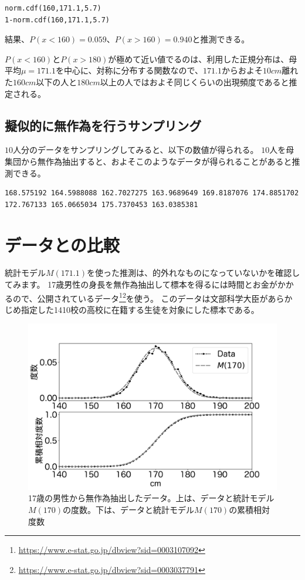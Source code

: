 \begin{lstlisting}
norm.cdf(160,171.1,5.7)
1-norm.cdf(160,171.1,5.7)
\end{lstlisting}
結果、$P(x<160)=0.059$、$P(x>160)=0.940$と推測できる。

$P(x<160)$と$P(x>180)$が極めて近い値でるのは、利用した正規分布は、母平均$\mu=171.1$を中心に、対称に分布する関数なので、$171.1$からおよそ$10cm$離れた$160cm$以下の人と$180cm$以上の人ではおよそ同じくらいの出現頻度であると推定される。
    
\subsection{擬似的に無作為を行うサンプリング}
$10$人分のデータをサンプリングしてみると、以下の数値が得られる。
$10$人を母集団から無作為抽出すると、およそこのようなデータが得られることがあると推測できる。

\begin{lstlisting}
168.575192 164.5988088 162.7027275 163.9689649 169.8187076 174.8851702 172.767133 165.0665034 175.7370453 163.0385381
\end{lstlisting}



\section{データとの比較}
統計モデル$M(171.1)$を使った推測は、的外れなものになっていないかを確認してみます。
17歳男性の身長を無作為抽出して標本を得るには時間とお金がかかるので、公開されているデータ\footnote{ \url{https://www.e-stat.go.jp/dbview?sid=0003107092} }\footnote{\url{https://www.e-stat.go.jp/dbview?sid=0003037791}}を使う。
このデータは文部科学大臣があらかじめ指定した1410校の高校に在籍する生徒を対象にした標本である。

\begin{figure}
\begin{center}
    \includegraphics[width=15cm]{./image/03_/cm_data.pdf}
    \caption{17歳の男性から無作為抽出したデータ。上は、データと統計モデル$M(170)$の度数。下は、データと統計モデル$M(170)$の累積相対度数}
    \label{fig:real_height_men}
\end{center}
\end{figure}


